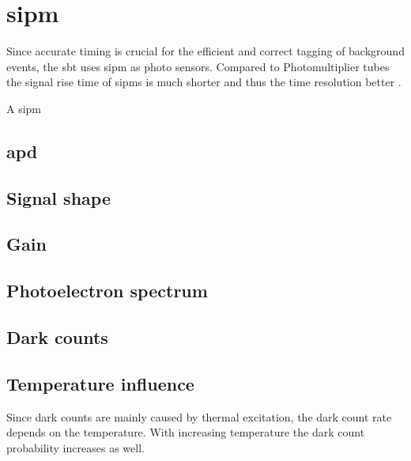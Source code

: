 \chapter{\ac{sipm}}
Since accurate timing is crucial for the efficient and correct tagging of background events, the \ac{sbt} uses \ac{sipm} as photo sensors. Compared to Photomultiplier tubes the signal rise time of \ac{sipm}s is much shorter and thus the time resolution better \cite{sipm_signal_risetime}. 

A \ac{sipm}


\section{\ac{apd}}


\section{Signal shape}


\section{Gain}


\section{Photoelectron spectrum}


\section{Dark counts}


\section{Temperature influence}
Since dark counts are mainly caused by thermal excitation, the dark count rate depends on the temperature. With increasing temperature the dark count probability increases as well. 